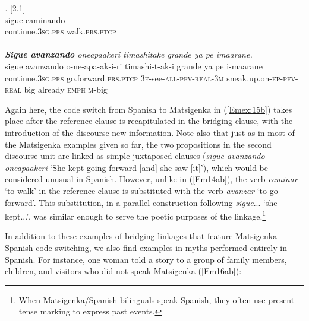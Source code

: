 \documentclass[output=paper]{LSP/langsci}
\begin{document}
\begin{exe}
\ex \label{Em15ab}
\begin{xlist}
\ex \label{Emex:15a}
\glt \textit{\underline{.}} [2.1]\\
\gll sigue caminando\\
 continue\textsc{.3sg.prs} walk\textsc{.prs.ptcp}\\
\glt {}\\
\ex \label{Emex:15b}
\glt \textit{\textbf{Sigue avanzando} oneapaakeri timashitake grande ya pe imaarane.}\\
\gll sigue avanzando o-ne-apa-ak-i-ri timashi-t-ak-i grande ya pe i-maarane\\     	      
    continue\textsc{.3sg.prs} go.forward\textsc{.prs.ptcp} \textsc{3f-}see\textsc{-all-pfv-real-3m} sneak.up.on\textsc{-ep-pfv-real} big already \textsc{emph} \textsc{m-}big\\
\glt {}
\end{xlist}
\end{exe}


Again here, the code switch from Spanish to Matsigenka in (\ref{Emex:15b}) takes place after the reference clause is recapitulated in the bridging clause, with the introduction of the discourse-new information. Note also that just as in most of the Matsigenka examples given so far, the two propositions in the second discourse unit are linked as simple juxtaposed clauses (\textit{sigue avanzando oneapaakeri} `She kept going forward [and] she saw [it]'), which would be considered unusual in Spanish. However, unlike in (\ref{Em14ab}), the verb \textit{caminar} `to walk' in the reference clause is substituted with the verb \textit{avanzar} `to go forward'. This substitution, in a parallel construction following \textit{sigue}... `she kept...', was similar enough to serve the poetic purposes of the linkage.\footnote{When Matsigenka/Spanish bilinguals speak Spanish, they often use present tense marking to express past events.}
 
 
In addition to these examples of bridging linkages that feature Matsigenka-Spanish code-switching, we also find examples in myths performed entirely in Spanish. For instance, one woman told a story to a group of family members, children, and visitors who did not speak Matsigenka (\ref{Em16ab}):
\end{document}
